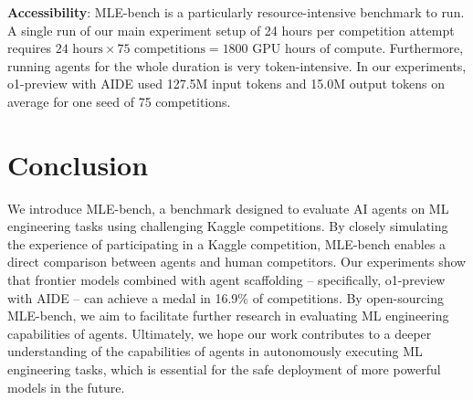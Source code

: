 \documentclass{article} %
\begin{document}
\textbf{Accessibility}: MLE-bench is a particularly resource-intensive benchmark to run. A single run of our main experiment setup of 24 hours per competition attempt requires $24 \text{ hours} \times 75 \text{ competitions} = 1800 \text{ GPU hours of compute}$. Furthermore, running agents for the whole duration is very token-intensive. In our experiments, o1-preview with AIDE used 127.5M input tokens and 15.0M output tokens on average for one seed of 75 competitions.




\section{Conclusion}
We introduce MLE-bench, a benchmark designed to evaluate AI agents on ML engineering tasks using challenging Kaggle competitions. By closely simulating the experience of participating in a Kaggle competition, MLE-bench enables a direct comparison between agents and human competitors. Our experiments show that frontier models combined with agent scaffolding -- specifically, o1-preview with AIDE -- can achieve a medal in 16.9\% of competitions. By open-sourcing MLE-bench, we aim to facilitate further research in evaluating ML engineering capabilities of agents. Ultimately, we hope our work contributes to a deeper understanding of the capabilities of agents in autonomously executing ML engineering tasks, which is essential for the safe deployment of more powerful models in the future.
\end{document}
